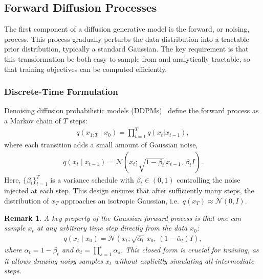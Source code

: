\documentclass[a4paper,12pt]{article}
\newtheorem{remark}{Remark}[section]
\begin{document}
\subsection{Forward Diffusion Processes}
The first component of a diffusion generative model is the forward, or noising, process. 
This process gradually perturbs the data distribution into a tractable prior distribution, typically a standard Gaussian. The key requirement is that this transformation be both easy to sample from and analytically tractable, so that training objectives can be computed efficiently. 

\subsubsection{Discrete-Time Formulation}
Denoising diffusion probabilistic models (DDPMs)~\cite{hoDenoisingDiffusionProbabilistic2020} define the forward process as a Markov chain of \(T\) steps:
\begin{align*}
    q\left(x_{1:T}\mid x_0\right)=\prod_{t=1}^{T}q\left(x_t|x_{t-1}\right),
\end{align*}
where each transition adds a small amount of Gaussian noise,
\begin{align*}
    q\left(x_t \mid x_{t-1}\right) = \mathcal{N}\!\left(x_t ; \sqrt{1-\beta_t}\,x_{t-1}, \, \beta_t I \right).
\end{align*}
Here, \(\{\beta_t\}_{t=1}^T\) is a variance schedule with \(\beta_t \in (0,1)\) controlling the noise injected at each step. 
This design ensures that after sufficiently many steps, the distribution of \(x_T\) approaches an isotropic Gaussian, i.e.~\(q(x_T) \approx \mathcal{N}(0,I)\).
\begin{remark}
    A key property of the Gaussian forward process is that one can sample $x_t$ at any arbitrary time step directly from the data \(x_0\):
    \begin{align*}
        q\left(x_t \mid x_0\right) = \mathcal{N}\!\left(x_t ; \sqrt{\bar \alpha_t}\,x_0, \,(1-\bar \alpha_t) I \right),
    \end{align*}
    where $\alpha_t = 1 - \beta_t$ and $\bar \alpha_t = \prod_{s=1}^t \alpha_s$. This closed form is crucial for training, as it allows drawing noisy samples \(x_t\) without explicitly simulating all intermediate steps.
\end{remark}
\end{document}
